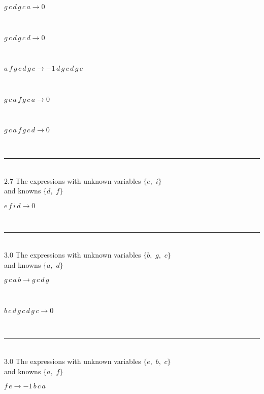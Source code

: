 \documentclass[rep10,leqno]{report}
\begin{document}
\begin{minipage}{6in}
$
g\,
 c\,
 d\,
 g\,
 c\,
 a\rightarrow 0
$
\end{minipage}\medskip \\
\begin{minipage}{6in}
$
g\,
 c\,
 d\,
 g\,
 c\,
 d\rightarrow 0
$
\end{minipage}\medskip \\
\begin{minipage}{6in}
$
a\,
 f\,
 g\,
 c\,
 d\,
 g\,
 c\rightarrow -1\,
 d\,
 g\,
 c\,
 d\,
 g\,
 c
$
\end{minipage}\medskip \\
\begin{minipage}{6in}
$
g\,
 c\,
 a\,
 f\,
 g\,
 c\,
 a\rightarrow 0
$
\end{minipage}\medskip \\
\begin{minipage}{6in}
$
g\,
 c\,
 a\,
 f\,
 g\,
 c\,
 d\rightarrow 0
$
\end{minipage}\\
\rule[3pt]{6in}{.7pt}\\
$2.7$  The expressions with unknown variables $\{e,
$ $
i\}$\\
and knowns $\{d,
$ $
f\}$\smallskip\\
\begin{minipage}{6in}
$
e\,
 f\,
 i\,
 d\rightarrow 0
$
\end{minipage}\\
\rule[3pt]{6in}{.7pt}\\
$3.0$  The expressions with unknown variables $\{b,
$ $
g,
$ $
c\}$\\
and knowns $\{a,
$ $
d\}$\smallskip\\
\begin{minipage}{6in}
$
g\,
 c\,
 a\,
 b\rightarrow g\,
 c\,
 d\,
 g
$
\end{minipage}\medskip \\
\begin{minipage}{6in}
$
b\,
 c\,
 d\,
 g\,
 c\,
 d\,
 g\,
 c\rightarrow 0
$
\end{minipage}\\
\rule[3pt]{6in}{.7pt}\\
$3.0$  The expressions with unknown variables $\{e,
$ $
b,
$ $
c\}$\\
and knowns $\{a,
$ $
f\}$\smallskip\\
\begin{minipage}{6in}
$
f\,
 e\rightarrow -1\,
 b\,
 c\,
 a
$
\end{minipage}\\
\end{document}
